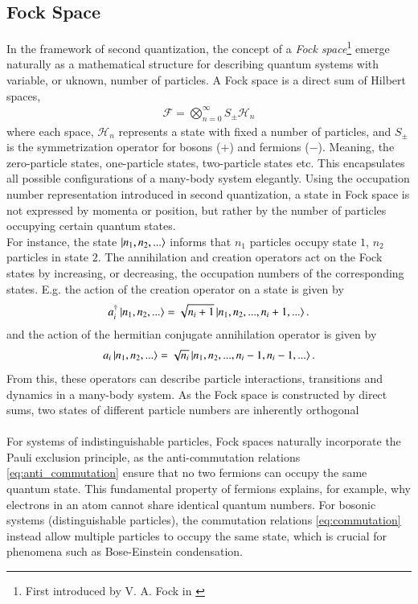 \documentclass{subfiles}
\begin{document}
\subsection{Fock Space}
In the framework of second quantization, the concept of a \emph{Fock space}\footnote{First introduced by V. A. Fock in \cite{fock1932konfigurationsraum}} emerge naturally as a mathematical structure for describing quantum systems with variable, or uknown, number of particles. A Fock space is a direct sum of Hilbert spaces, 
\begin{align*}
    \mathcal{F} = \bigotimes_{n=0}^\infty S_{\pm} \mathcal{H}_n
\end{align*}
where each space, $\mathcal{H}_n$ represents a state with fixed a number of particles, and $S_{\pm}$ is the symmetrization operator for bosons ($+$) and fermions ($-$). Meaning, the zero-particle states, one-particle states, two-particle states etc. This encapsulates all possible configurations of a many-body system elegantly. Using the occupation number representation introduced in second quantization, a state in Fock space is not expressed by momenta or position, but rather by the number of particles occupying certain quantum states. \\
For instance, the state $\ket{n_1, n_2, ...}$ informs that $n_1$ particles occupy state $1$, $n_2$ particles  in state $2$. The annihilation and creation operators act on the Fock states by increasing, or decreasing, the occupation numbers of the corresponding states. E.g. the action of the creation operator on a state is given by
\begin{align*}
    a^\dagger_i\ket{n_1, n_2, ...} = \sqrt{n_i + 1}\ket{n_1, n_2, ..., n_i + 1, ...}.
\end{align*}
and the action of the hermitian conjugate annihilation operator is given by
\begin{align*}
    a_i\ket{n_1, n_2, ...} = \sqrt{n_i}\ket{n_1, n_2, ...,n_i-1, n_i - 1, ...}.
\end{align*}
From this, these operators can describe particle interactions, transitions and dynamics in a many-body system. As the Fock space is constructed by direct sums, two states of different particle numbers are inherently orthogonal 
\\\\ 
For systems of indistinguishable particles, Fock spaces naturally incorporate the Pauli exclusion principle, as the anti-commutation relations \ref{eq:anti_commutation} ensure that no two fermions can occupy the same quantum state. This fundamental property of fermions explains, for example, why electrons in an atom cannot share identical quantum numbers. For bosonic systems (distinguishable particles), the commutation relations \ref{eq:commutation} instead allow multiple particles to occupy the same state, which is crucial for phenomena such as Bose-Einstein condensation.
\end{document}
